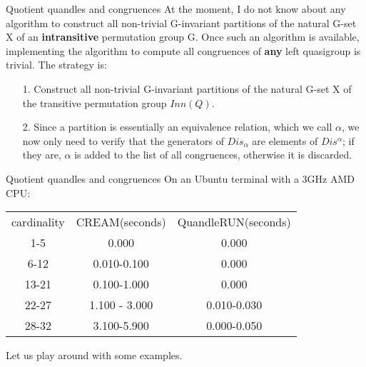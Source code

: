 \begin{frame}{Quotient quandles and congruences}
    At the moment, I do not know about any algorithm to construct all non-trivial G-invariant partitions of the natural G-set X of an \textbf{intransitive} permutation group G. Once such an algorithm is available, implementing the algorithm to compute all congruences of \textbf{any} left quasigroup is trivial.\newline\newline
    The strategy is:
    \begin{itemize}
        \item[1.] Construct all non-trivial G-invariant partitions of the natural G-set X of the transitive permutation group $Inn(Q)$.
        \item[2.] Since a partition is essentially an equivalence relation, which we call $\alpha$, we now only need to verify that the generators of $Dis_\alpha$ are elements of $Dis^\alpha$; if they are, $\alpha$ is added to the list of all congruences, otherwise it is discarded.  
    \end{itemize}
\end{frame}

\begin{frame}{Quotient quandles and congruences}
    On an Ubuntu terminal with a 3GHz AMD CPU: \newline
    \begin{center}
        \begin{tabular}{c|c|c}
         cardinality & CREAM(seconds) & QuandleRUN(seconds) \\
         1-5 & 0.000 & 0.000 \\
         6-12 & 0.010-0.100 & 0.000 \\
         13-21 & 0.100-1.000 & 0.000 \\
         22-27& 1.100 - 3.000 & 0.010-0.030 \\
         28-32& 3.100-5.900& 0.000-0.050 \\
         
    \end{tabular}
    \end{center}
\end{frame}

\begin{frame}{Let us play around with some examples.}
    
    \begin{center}
    \end{center}
    
\end{frame}


